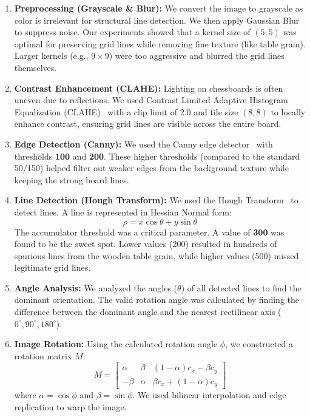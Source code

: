 \documentclass[12pt]{article}
\begin{document}
\begin{enumerate}
    \item \textbf{Preprocessing (Grayscale \& Blur):}
    We convert the image to grayscale as color is irrelevant for structural line detection. We then apply Gaussian Blur to suppress noise. Our experiments showed that a kernel size of $(5,5)$ was optimal for preserving grid lines while removing fine texture (like table grain). Larger kernels (e.g., $9 \times 9$) were too aggressive and blurred the grid lines themselves.
    
    \item \textbf{Contrast Enhancement (CLAHE):}
    Lighting on chessboards is often uneven due to reflections. We used Contrast Limited Adaptive Histogram Equalization (CLAHE)~\cite{zuiderveld1994clahe} with a clip limit of 2.0 and tile size $(8,8)$ to locally enhance contrast, ensuring grid lines are visible across the entire board.

    \item \textbf{Edge Detection (Canny):}
    We used the Canny edge detector~\cite{canny1986computational} with thresholds \textbf{100} and \textbf{200}. These higher thresholds (compared to the standard 50/150) helped filter out weaker edges from the background texture while keeping the strong board lines.

    \item \textbf{Line Detection (Hough Transform):}
    We used the Hough Transform~\cite{duda1972use} to detect lines. A line is represented in Hessian Normal form:
    \begin{equation}
        \rho = x \cos \theta + y \sin \theta
    \end{equation}
    The accumulator threshold was a critical parameter. A value of \textbf{300} was found to be the sweet spot. Lower values (200) resulted in hundreds of spurious lines from the wooden table grain, while higher values (500) missed legitimate grid lines.

    \item \textbf{Angle Analysis:}
    We analyzed the angles ($\theta$) of all detected lines to find the dominant orientation. The valid rotation angle was calculated by finding the difference between the dominant angle and the nearest rectilinear axis ($0^\circ, 90^\circ, 180^\circ$).

    \item \textbf{Image Rotation:}
    Using the calculated rotation angle $\phi$, we constructed a rotation matrix $M$:
    \begin{equation}
        M = \begin{bmatrix}
        \alpha & \beta & (1-\alpha)c_x - \beta c_y \\
        -\beta & \alpha & \beta c_x + (1-\alpha)c_y
        \end{bmatrix}
    \end{equation}
    where $\alpha = \cos \phi$ and $\beta = \sin \phi$. We used bilinear interpolation and edge replication to warp the image.
\end{enumerate}
\end{document}
